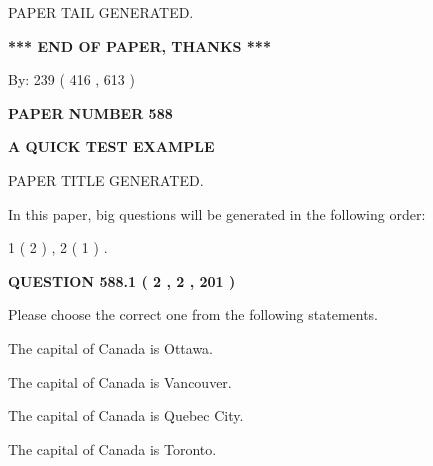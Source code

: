 \documentclass[12pt]{article}
\begin{document}
   
   
   
   
   
 \vspace{0.2in}
 
   
   
\vspace{2.0in} PAPER TAIL GENERATED.
   
   
   
   
\vspace{1.0in} 
{\textbf{\large{ *** END OF PAPER, THANKS *** }}} 
   
   
\hspace{1.0in} By: 
 239 ( 416 ,  613 )
   
   
   
   
\newpage 
\setcounter{page}{ 
   588001 } 
   
   
   
   
 {\textbf{ \Large{ PAPER NUMBER  588  }}}
   
   
\vspace{0.2in}
   
   
   
   
   
   
   
   
 \vspace{0.2in}
{\LARGE {\textbf{ A QUICK TEST EXAMPLE}}}
   
   
 PAPER TITLE GENERATED.
   
   
   
\vspace{0.2in}
   
In this paper, big questions will be generated in the following order: 
   
   
   1 ( 2 )
 ,
   2 ( 1 )
 .
  
\vspace{0.2in}
  
{\textbf{\Large{QUESTION
588.1 
 ( 2 , 2 , 201 )
}}}
  
  
Please choose the correct one from the following statements.
 
 
The capital of Canada is Ottawa.
 
 
The capital of Canada is Vancouver.
 
 
The capital of Canada is Quebec City.
 
 
The capital of Canada is Toronto.
 
\end{document}
